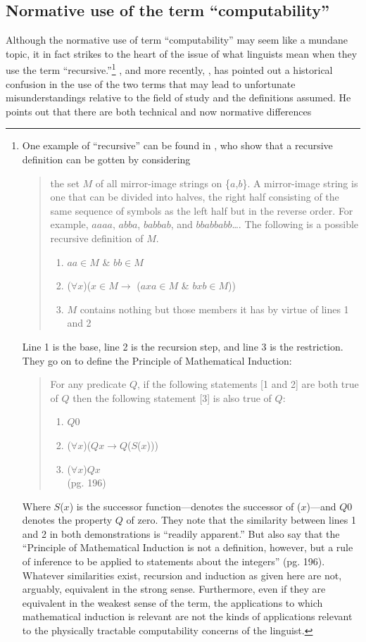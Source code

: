 \documentclass[11pt,twoside]{article}
\begin{document}
\subsection{Normative use of the term ``computability''}\label{normcomp}
Although the normative use of term ``computability'' may seem like a mundane topic, it in fact strikes to the heart of the issue of what linguists mean when they use the term ``recursive.''\footnote{One example of ``recursive'' can be found in \cite[181-82]{pmw:1990}, who show that a recursive definition can be gotten by considering \begin{quotation} the set $M$ of all mirror-image strings on \{$a$,$b$\}. A mirror-image string is one that can be divided into halves, the right half consisting of the same sequence of symbols as the left half but in the reverse order. For example, $aaaa$, $abba$, $babbab$, and $bbabbabb$\ldots. The following is a possible recursive definition of $M$. \begin{enumerate} \item $aa \in M$ \& $bb \in M$ \item ($\forall$$x$)($x \in M \rightarrow$ ($axa \in M$ \& $bxb \in M$)) \item $M$ contains nothing but those members it has by virtue of lines 1 and 2\\\end{enumerate}\end{quotation} Line 1 is the base, line 2 is the recursion step, and line 3 is the restriction. They go on to define the Principle of Mathematical Induction: \begin{quote} For any predicate $Q$, if the following statements [1 and 2] are both true of $Q$ then the following statement [3] is also true of $Q$: \begin{enumerate} \item $Q$0 \item ($\forall$$x$)($Qx \rightarrow Q$($S$($x$))) \item ($\forall$$x$)$Qx$\\ (pg. 196)\end{enumerate}\end{quote} Where $S$($x$) is the successor function---denotes the successor of ($x$)---and $Q$0 denotes the property $Q$ of zero. They note that the similarity between lines 1 and 2 in both demonstrations is ``readily apparent.'' But also say that the ``Principle of Mathematical Induction is not a definition, however, but a rule of inference to be applied to statements about the integers'' (pg. 196). Whatever similarities exist, recursion and induction as given here are not, arguably, equivalent in the strong sense. Furthermore, even if they are equivalent in the weakest sense of the term, the applications to which mathematical induction is relevant are not the kinds of applications relevant to the physically tractable computability concerns of the linguist.} \cite{soare:1996}, and more recently, \cite{soare:2007,soare:2008}, has pointed out a historical confusion in the use of the two terms that may lead to unfortunate misunderstandings relative to the field of study and the definitions assumed. He points out that there are both technical and now normative differences 
\end{document}
